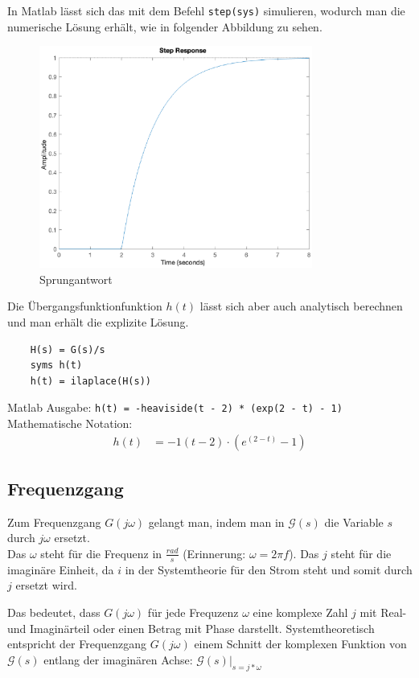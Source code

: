 In Matlab lässt sich das mit dem Befehl \texttt{step(sys)} simulieren, wodurch man die numerische Lösung erhält, wie in folgender Abbildung zu sehen.

\begin{figure}[H]
    \label{fig:sprung}
    \centering
    \includegraphics[width=0.8\textwidth]{Bilder/SprungantwortPT1Tt.eps}
    \caption{Sprungantwort}
 \end{figure}

Die Übergangsfunktionfunktion $h(t)$ lässt sich aber auch analytisch berechnen und man erhält die explizite Lösung.

\begin{verbatim}
    H(s) = G(s)/s
    syms h(t)
    h(t) = ilaplace(H(s))
\end{verbatim} 

Matlab Ausgabe: \texttt{h(t) = -heaviside(t - 2) * (exp(2 - t) - 1)}\\
Mathematische Notation: 
\begin{align*}
    h(t) &= -1(t-2)\cdot(e^{(2-t)}-1)
\end{align*}


\subsection{Frequenzgang}
Zum Frequenzgang $G(j \omega)$ gelangt man, indem man in $\mathcal{G}(s)$ die Variable $s$ durch $j \omega$ ersetzt.\\
Das $\omega$ steht für die Frequenz in $\frac{rad}{s}$ (Erinnerung: $\omega = 2\pi f$). Das $j$ steht für die imaginäre Einheit, da $i$ in der Systemtheorie für den Strom steht und somit durch $j$ ersetzt wird.

Das bedeutet, dass $G(j \omega)$ für jede Frequzenz $\omega$ eine komplexe Zahl $j$ mit Real- und Imaginärteil oder einen Betrag mit Phase darstellt.
Systemtheoretisch entspricht der Frequenzgang $G(j\omega)$ einem Schnitt der komplexen Funktion von $\mathcal{G}(s)$ entlang der imaginären Achse: $\mathcal{G}(s)|_{s = j * \omega}$

